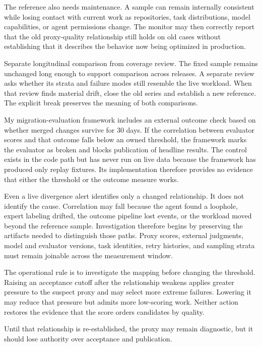 The reference also needs maintenance. A sample can remain internally consistent while losing contact with current work as repositories, task distributions, model capabilities, or agent permissions change. The monitor may then correctly report that the old proxy-quality relationship still holds on old cases without establishing that it describes the behavior now being optimized in production.

Separate longitudinal comparison from coverage review. The fixed sample remains unchanged long enough to support comparison across releases. A separate review asks whether its strata and failure modes still resemble the live workload. When that review finds material drift, close the old series and establish a new reference. The explicit break preserves the meaning of both comparisons.

My migration-evaluation framework includes an external outcome check based on whether merged changes survive for 30 days. If the correlation between evaluator scores and that outcome falls below an owned threshold, the framework marks the evaluator as broken and blocks publication of headline results. The control exists in the code path but has never run on live data because the framework has produced only replay fixtures. Its implementation therefore provides no evidence that either the threshold or the outcome measure works.

Even a live divergence alert identifies only a changed relationship. It does not identify the cause. Correlation may fall because the agent found a loophole, expert labeling drifted, the outcome pipeline lost events, or the workload moved beyond the reference sample. Investigation therefore begins by preserving the artifacts needed to distinguish those paths. Proxy scores, external judgments, model and evaluator versions, task identities, retry histories, and sampling strata must remain joinable across the measurement window.

The operational rule is to investigate the mapping before changing the threshold. Raising an acceptance cutoff after the relationship weakens applies greater pressure to the suspect proxy and may select more extreme failures. Lowering it may reduce that pressure but admits more low-scoring work. Neither action restores the evidence that the score orders candidates by quality.

Until that relationship is re-established, the proxy may remain diagnostic, but it should lose authority over acceptance and publication.

